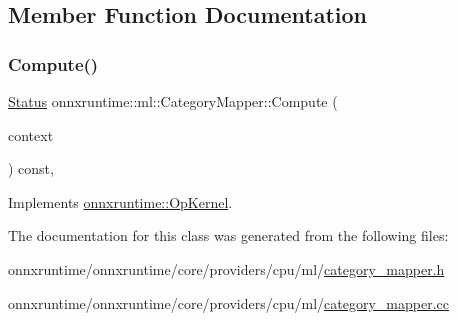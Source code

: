 \subsection{Member Function Documentation}
\mbox{\label{classonnxruntime_1_1ml_1_1CategoryMapper_af6a6cf9bb4b55b1ab3d7484f2e514f21}} 
\subsubsection{\texorpdfstring{Compute()}{Compute()}}
{\footnotesize\ttfamily \mbox{\hyperlink{classonnxruntime_1_1common_1_1Status}{Status}} onnxruntime\+::ml\+::\+Category\+Mapper\+::\+Compute (\begin{DoxyParamCaption}\item[{\mbox{\hyperlink{classonnxruntime_1_1OpKernelContext}{Op\+Kernel\+Context}} $\ast$}]{context }\end{DoxyParamCaption}) const\hspace{0.3cm}{\ttfamily [override]}, {\ttfamily [virtual]}}



Implements \mbox{\hyperlink{classonnxruntime_1_1OpKernel_a9eca8656a78b1b3ab9d3351a12798650}{onnxruntime\+::\+Op\+Kernel}}.



The documentation for this class was generated from the following files\+:\begin{DoxyCompactItemize}
\item 
onnxruntime/onnxruntime/core/providers/cpu/ml/\mbox{\hyperlink{category__mapper_8h}{category\+\_\+mapper.\+h}}\item 
onnxruntime/onnxruntime/core/providers/cpu/ml/\mbox{\hyperlink{category__mapper_8cc}{category\+\_\+mapper.\+cc}}\end{DoxyCompactItemize}

